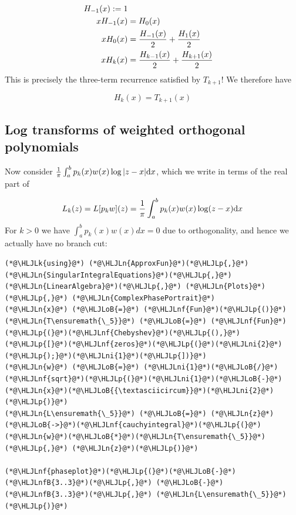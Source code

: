 \documentclass[12pt,a4paper]{article}
\newcommand{\HLJLk}[1]{\textcolor[RGB]{148,91,176}{\textbf{#1}}}
\newcommand{\HLJLn}[1]{#1}
\newcommand{\HLJLnf}[1]{\textcolor[RGB]{66,102,213}{#1}}
\newcommand{\HLJLnfB}[1]{\textcolor[RGB]{59,151,46}{#1}}
\newcommand{\HLJLni}[1]{\textcolor[RGB]{59,151,46}{#1}}
\newcommand{\HLJLoB}[1]{\textcolor[RGB]{102,102,102}{\textbf{#1}}}
\newcommand{\HLJLp}[1]{#1}
\def\D{ {\rm d} }
\def\dx{\D x}
\begin{document}
\begin{align*}
H_{-1}(x) := 1 \\ 
 xH_{-1}(x)  &= H_0(x) \\
x H_0(x) &= {H_{-1}(x) \over 2} + {H_1(x) \over 2} \\
x H_k(x) &= {H_{k-1}(x) \over 2} + {H_{k+1}(x) \over 2} 
\end{align*}
This is precisely the three-term recurrence satisfied by $T_{k+1}$! We therefore have

\[
H_k(x) = T_{k+1}(x)
\]
\subsection{Log transforms of weighted orthogonal polynomials}
Now consider ${1 \over \pi} \int_a^b p_k(x) w(x) \log |z-x| \dx$, which we write in terms of the real part of

\[
L_k(z) = L[p_k w](z) = {1 \over \pi } \int_a^b p_k(x) w(x) \log (z-x) \dx
\]
For $k > 0$ we have $\int_a^b p_k(x) w(x) dx = 0$ due to orthogonality, and hence we actually have no branch cut:


\begin{lstlisting}
(*@\HLJLk{using}@*) (*@\HLJLn{ApproxFun}@*)(*@\HLJLp{,}@*) (*@\HLJLn{SingularIntegralEquations}@*)(*@\HLJLp{,}@*) (*@\HLJLn{LinearAlgebra}@*)(*@\HLJLp{,}@*) (*@\HLJLn{Plots}@*)(*@\HLJLp{,}@*) (*@\HLJLn{ComplexPhasePortrait}@*)
(*@\HLJLn{x}@*) (*@\HLJLoB{=}@*) (*@\HLJLnf{Fun}@*)(*@\HLJLp{()}@*)
(*@\HLJLn{T\ensuremath{\_5}}@*) (*@\HLJLoB{=}@*) (*@\HLJLnf{Fun}@*)(*@\HLJLp{(}@*)(*@\HLJLnf{Chebyshev}@*)(*@\HLJLp{(),}@*) (*@\HLJLp{[}@*)(*@\HLJLnf{zeros}@*)(*@\HLJLp{(}@*)(*@\HLJLni{2}@*)(*@\HLJLp{);}@*)(*@\HLJLni{1}@*)(*@\HLJLp{])}@*)
(*@\HLJLn{w}@*) (*@\HLJLoB{=}@*) (*@\HLJLni{1}@*)(*@\HLJLoB{/}@*)(*@\HLJLnf{sqrt}@*)(*@\HLJLp{(}@*)(*@\HLJLni{1}@*)(*@\HLJLoB{-}@*)(*@\HLJLn{x}@*)(*@\HLJLoB{{\textasciicircum}}@*)(*@\HLJLni{2}@*)(*@\HLJLp{)}@*)
(*@\HLJLn{L\ensuremath{\_5}}@*) (*@\HLJLoB{=}@*) (*@\HLJLn{z}@*)(*@\HLJLoB{->}@*)(*@\HLJLnf{cauchyintegral}@*)(*@\HLJLp{(}@*)(*@\HLJLn{w}@*)(*@\HLJLoB{*}@*)(*@\HLJLn{T\ensuremath{\_5}}@*)(*@\HLJLp{,}@*) (*@\HLJLn{z}@*)(*@\HLJLp{)}@*)

(*@\HLJLnf{phaseplot}@*)(*@\HLJLp{(}@*)(*@\HLJLoB{-}@*)(*@\HLJLnfB{3..3}@*)(*@\HLJLp{,}@*) (*@\HLJLoB{-}@*)(*@\HLJLnfB{3..3}@*)(*@\HLJLp{,}@*) (*@\HLJLn{L\ensuremath{\_5}}@*)(*@\HLJLp{)}@*)
\end{lstlisting}
\end{document}
